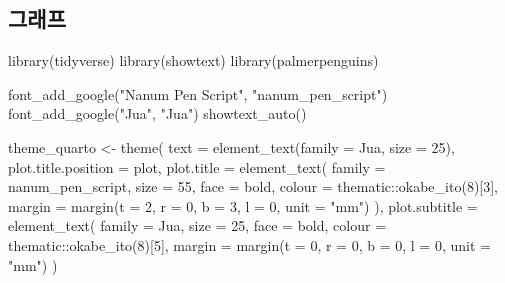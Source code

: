 \documentclass[
  letterpaper,
  DIV=11,
  numbers=noendperiod]{scrartcl}
\newenvironment{Shaded}{\begin{snugshade}}{\end{snugshade}}
\newcommand{\AttributeTok}[1]{\textcolor[rgb]{0.40,0.45,0.13}{#1}}
\newcommand{\DecValTok}[1]{\textcolor[rgb]{0.68,0.00,0.00}{#1}}
\newcommand{\FunctionTok}[1]{\textcolor[rgb]{0.28,0.35,0.67}{#1}}
\newcommand{\NormalTok}[1]{\textcolor[rgb]{0.00,0.23,0.31}{#1}}
\newcommand{\OtherTok}[1]{\textcolor[rgb]{0.00,0.23,0.31}{#1}}
\newcommand{\SpecialCharTok}[1]{\textcolor[rgb]{0.37,0.37,0.37}{#1}}
\newcommand{\StringTok}[1]{\textcolor[rgb]{0.13,0.47,0.30}{#1}}
\begin{document}
\hypertarget{uxadf8uxb798uxd504}{%
\subsection{그래프}\label{uxadf8uxb798uxd504}}

\begin{Shaded}
\begin{Highlighting}[]
\FunctionTok{library}\NormalTok{(tidyverse)}
\FunctionTok{library}\NormalTok{(showtext)}
\FunctionTok{library}\NormalTok{(palmerpenguins)}

\FunctionTok{font\_add\_google}\NormalTok{(}\StringTok{"Nanum Pen Script"}\NormalTok{, }\StringTok{"nanum\_pen\_script"}\NormalTok{)}
\FunctionTok{font\_add\_google}\NormalTok{(}\StringTok{"Jua"}\NormalTok{, }\StringTok{"Jua"}\NormalTok{)}
\FunctionTok{showtext\_auto}\NormalTok{()}

\NormalTok{theme\_quarto }\OtherTok{\textless{}{-}} \FunctionTok{theme}\NormalTok{(}
  \AttributeTok{text =} \FunctionTok{element\_text}\NormalTok{(}\AttributeTok{family =} \StringTok{\textquotesingle{}Jua\textquotesingle{}}\NormalTok{, }\AttributeTok{size =} \DecValTok{25}\NormalTok{),}
  \AttributeTok{plot.title.position =} \StringTok{\textquotesingle{}plot\textquotesingle{}}\NormalTok{,}
  \AttributeTok{plot.title =} \FunctionTok{element\_text}\NormalTok{(}
    \AttributeTok{family =} \StringTok{\textquotesingle{}nanum\_pen\_script\textquotesingle{}}\NormalTok{, }\AttributeTok{size =} \DecValTok{55}\NormalTok{,}
    \AttributeTok{face =} \StringTok{\textquotesingle{}bold\textquotesingle{}}\NormalTok{, }
    \AttributeTok{colour =}\NormalTok{ thematic}\SpecialCharTok{::}\FunctionTok{okabe\_ito}\NormalTok{(}\DecValTok{8}\NormalTok{)[}\DecValTok{3}\NormalTok{],}
    \AttributeTok{margin =} \FunctionTok{margin}\NormalTok{(}\AttributeTok{t =} \DecValTok{2}\NormalTok{, }\AttributeTok{r =} \DecValTok{0}\NormalTok{, }\AttributeTok{b =} \DecValTok{3}\NormalTok{, }\AttributeTok{l =} \DecValTok{0}\NormalTok{, }\AttributeTok{unit =} \StringTok{"mm"}\NormalTok{)}
\NormalTok{  ),}
  \AttributeTok{plot.subtitle =} \FunctionTok{element\_text}\NormalTok{(}
    \AttributeTok{family =} \StringTok{\textquotesingle{}Jua\textquotesingle{}}\NormalTok{, }\AttributeTok{size =} \DecValTok{25}\NormalTok{,}
    \AttributeTok{face =} \StringTok{\textquotesingle{}bold\textquotesingle{}}\NormalTok{, }
    \AttributeTok{colour =}\NormalTok{ thematic}\SpecialCharTok{::}\FunctionTok{okabe\_ito}\NormalTok{(}\DecValTok{8}\NormalTok{)[}\DecValTok{5}\NormalTok{],}
    \AttributeTok{margin =} \FunctionTok{margin}\NormalTok{(}\AttributeTok{t =} \DecValTok{0}\NormalTok{, }\AttributeTok{r =} \DecValTok{0}\NormalTok{, }\AttributeTok{b =} \DecValTok{0}\NormalTok{, }\AttributeTok{l =} \DecValTok{0}\NormalTok{, }\AttributeTok{unit =} \StringTok{"mm"}\NormalTok{)}
\NormalTok{  )}
  

\end{Highlighting}
\end{Shaded}
\end{document}
